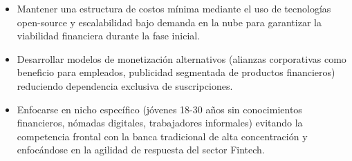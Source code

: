 \begin{itemize}
	\item Mantener una estructura de costos mínima mediante el uso de tecnologías open-source y escalabilidad bajo demanda en la nube para garantizar la viabilidad financiera durante la fase inicial.
	
	\item Desarrollar modelos de monetización alternativos (alianzas corporativas como beneficio para empleados, publicidad segmentada de productos financieros) reduciendo dependencia exclusiva de suscripciones.
	
	\item Enfocarse en nicho específico (jóvenes 18-30 años sin conocimientos financieros, nómadas digitales, trabajadores informales) evitando la competencia frontal con la banca tradicional de alta concentración y enfocándose en la agilidad de respuesta del sector Fintech.
\end{itemize}